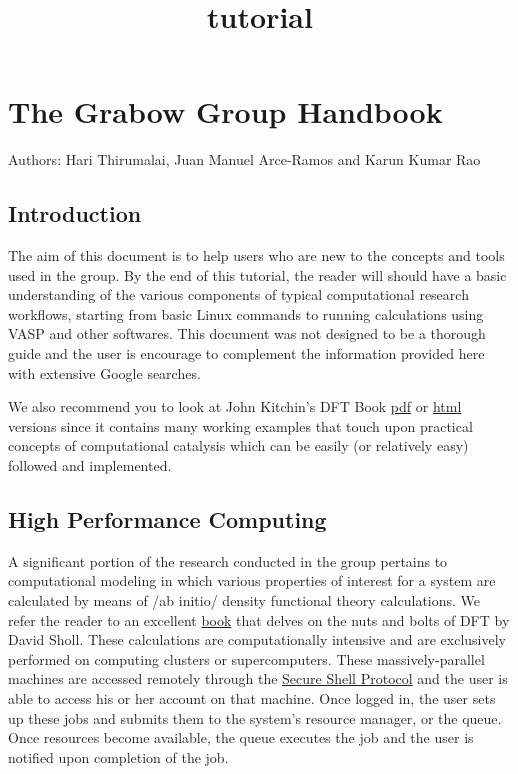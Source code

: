 \documentclass[11pt]{article}
\title{tutorial}
\begin{document}
    
    
    \maketitle
    
    

    
    \section{The Grabow Group Handbook}\label{the-grabow-group-handbook}

Authors: Hari Thirumalai, Juan Manuel Arce-Ramos and Karun Kumar Rao

    \subsection{Introduction}\label{introduction}

The aim of this document is to help users who are new to the concepts
and tools used in the group. By the end of this tutorial, the reader
will should have a basic understanding of the various components of
typical computational research workflows, starting from basic Linux
commands to running calculations using VASP and other softwares. This
document was not designed to be a thorough guide and the user is
encourage to complement the information provided here with extensive
Google searches.

We also recommend you to look at John Kitchin's DFT Book
\href{http://kitchingroup.cheme.cmu.edu/dft-book/dft.pdf}{pdf} or
\href{http://kitchingroup.cheme.cmu.edu/dft-book/dft.html}{html}
versions since it contains many working examples that touch upon
practical concepts of computational catalysis which can be easily (or
relatively easy) followed and implemented.

    \subsection{High Performance
Computing}\label{high-performance-computing}

A significant portion of the research conducted in the group pertains to
computational modeling in which various properties of interest for a
system are calculated by means of /ab initio/ density functional theory
calculations. We refer the reader to an excellent
\href{https://www.wiley.com/en-us/Density+Functional+Theory\%3A+A+Practical+Introduction-p-9780470373170}{book}
that delves on the nuts and bolts of DFT by David Sholl. These
calculations are computationally intensive and are exclusively performed
on computing clusters or supercomputers. These massively-parallel
machines are accessed remotely through the
\href{https://www.ssh.com/ssh/protocol}{Secure Shell Protocol} and the
user is able to access his or her account on that machine. Once logged
in, the user sets up these jobs and submits them to the system's
resource manager, or the queue. Once resources become available, the
queue executes the job and the user is notified upon completion of the
job.
\end{document}
